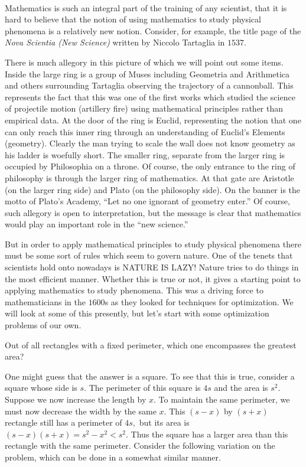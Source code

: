 \\
Mathematics is such an integral part of the training of any scientist,
that it is hard to believe that the notion of using mathematics to
study physical phenomena is a relatively new notion.  Consider, for
example, the title page of the \emph{Nova Scientia (New Science)} written by
Niccolo Tartaglia in $1537. $

There is much allegory in this picture of which we will point out some
items.  Inside the large ring is a group of Muses including Geometria
and Arithmetica and others surrounding Tartaglia observing the
trajectory of a cannonball.  This represents the fact that this was
one of the first works which studied the science of projectile motion
(artillery fire) using mathematical principles rather than empirical
data.  At the door of the ring is Euclid, representing the notion that
one can only reach this inner ring through an understanding of
Euclid's Elements (geometry).  Clearly the man trying to scale the
wall does not know geometry as his ladder is woefully short.  The
smaller ring, separate from the larger ring is occupied by Philosophia
on a throne.  Of course, the only entrance to the ring of philosophy
is through the larger ring of mathematics.    At that gate are
Aristotle (on the larger ring side) and Plato (on the philosophy
side).  On the banner is the motto of Plato's Academy, ``Let no one
ignorant of geometry enter.''  Of course, such allegory is open to
interpretation, but the message is clear that mathematics would play
an important role in the ``new science.''   

But in order to apply mathematical principles to study physical
phenomena there must be some sort of rules which seem to govern
nature.  One of the tenets that scientists hold onto nowadays is
{\sc{}NATURE IS LAZY!}  Nature tries to do things in the most
efficient manner.  Whether this is true or not, it gives a starting
point to applying mathematics to study phenomena.  This was a driving
force to mathematicians in the $1600$s as they looked for techniques
for optimization.  We will look at some of this presently, but let's
start with some optimization problems of our own.

  Out of all rectangles with a fixed
perimeter, which one encompasses the greatest area?    

One might guess that the answer is a square.  To see that this is
true, consider a square whose side is $s.$  The perimeter of this square
is $4s$ and the area is $s^2.$  Suppose we now increase the length by $x.$
To maintain the same perimeter, we must now decrease the width by the
same $x.$  This $(s-x)$ by $(s+x)$ rectangle still has a perimeter of $4s,$
but its area is $(s-x)(s+x)=s^2-x^2<s^2.$  Thus the square has a larger
area than this rectangle with the same perimeter.  Consider the
following variation on the problem, which can be done in a somewhat
similar manner. 

